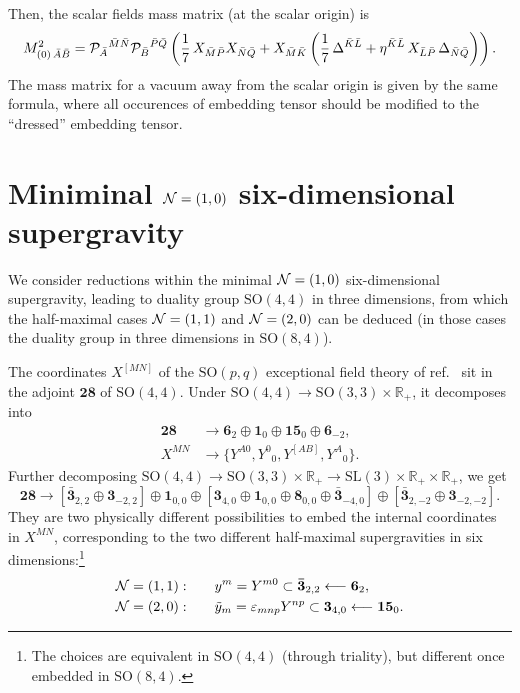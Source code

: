 \documentclass[11pt]{article}
\newcommand{\SO}{\ensuremath{\mathrm{SO}}\xspace}
\newcommand{\SL}{\ensuremath{\mathrm{SL}}\xspace}
\newcommand{\R}{\ensuremath{\mathbb{R}}\xspace}
\begin{document}
Then, the scalar fields mass matrix (at the scalar origin) is
\begin{equation}
  M_{(0)\,\bar A\bar B}^{2} = {\cal P}_{\bar A}{}^{\bar M\bar N}{\cal P}_{\bar B}{}^{\bar P\bar Q}\left(\frac{1}{7}\,X_{\bar M\bar P}X_{\bar N\bar Q}+X_{\bar M\bar K}\left(\frac{1}{7}\,\Delta^{\bar K\bar L}+\eta^{\bar K\bar L}\,X_{\bar L\bar P}\,\Delta_{\bar N\bar Q}\right)\right).
\end{equation}
The mass matrix for a vacuum away from the scalar origin is given by the same formula, where all occurences of embedding tensor should be modified to the ``dressed'' embedding tensor.




\appendix

\section{Miniminal ${\cal N}=(1,0)$ six-dimensional supergravity}
We consider reductions within the minimal ${\cal N}=(1,0)$ six-dimensional supergravity, leading to duality group $\SO(4,4)$ in three dimensions, from which the half-maximal cases ${\cal N}=(1,1)$ and ${\cal N}=(2,0)$ can be deduced (in those cases the duality group in three dimensions in $\SO(8,4)$).

The coordinates $X^{[MN]}$ of the $\SO(p,q)$ exceptional field theory of ref.~\cite{Hohm:2017wtr} sit in the adjoint $\bm{28}$ of $\SO(4,4)$. Under $\SO(4,4)\rightarrow\SO(3,3)\times\R_{+}$, it decomposes into
\begin{equation}  
  \begin{aligned}
    \bm{28} &\longrightarrow \bm{6}_{2} \oplus \bm{1}_{0} \oplus \bm{15}_{0} \oplus \bm{6}_{-2},\\
    X^{MN} &\longrightarrow \{Y^{A0},Y^{0}{}_{0},Y^{[AB]},Y^{A}{}_{0}\}.
  \end{aligned}
\end{equation}
Further decomposing $\SO(4,4)\rightarrow\SO(3,3)\times\R_{+}\rightarrow\SL(3)\times\R_{+}\times\R_{+}$, we get
\begin{equation}  \label{eq:decomp28SO8}
  \bm{28} \longrightarrow \left[\bm{\bar{3}}_{2,2} \oplus \bm{3}_{-2,2}\right] \oplus \bm{1}_{0,0} \oplus \left[\bm{3}_{4,0} \oplus \bm{1}_{0,0} \oplus \bm{8}_{0,0} \oplus \bm{\bar{3}}_{-4,0}\right] \oplus \left[\bm{\bar{3}}_{2,-2} \oplus \bm{3}_{-2,-2}\right].
\end{equation}
They are two physically different possibilities to embed the internal coordinates in $X^{MN}$, corresponding to the two different half-maximal supergravities in six dimensions:\footnote{The choices are equivalent in $\SO(4,4)$ (through triality), but different once embedded in $\SO(8,4)$.}
\begin{equation}  \label{eq:coordSO8}
  \begin{aligned}
    {\cal N}=(1,1):&\qquad y^{m}=Y^{m0}\subset\bm{\bar{3}}_{2,2} \longleftarrow \bm{6}_{2},\\
    {\cal N}=(2,0):&\qquad \tilde{y}_{m}=\varepsilon_{mnp}Y^{np}\subset\bm{3}_{4,0}\longleftarrow\bm{15}_{0}.
  \end{aligned}
\end{equation}
\end{document}
